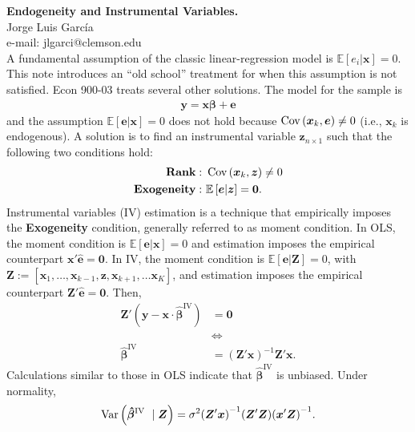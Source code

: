 
\let\counterwithout\relax
\let\counterwithin\relax
{}




\noindent \textbf{Endogeneity and Instrumental Variables.}\\
\noindent Jorge Luis García \\
\noindent e-mail: jlgarci@clemson.edu\\

\noindent A fundamental assumption of the classic linear-regression model is $\mathbb{E} \left[ e_i | \bm{x} \right] = 0$. This note introduces an ``old school'' treatment for when this assumption is not satisfied. Econ 900-03 treats several other solutions. The model for the sample is 
\begin{align}
	\bm{y} = \bm{x} \bm{\beta} + \bm{e} 
\end{align}
\noindent and the assumption $\mathbb{E} \left[ \bm{e} | \bm{x} \right] = 0$ does not hold because $ \operatorname{Cov} \left( \bm{x}_k, \bm{e}  \right) \neq 0$ (i.e., $\bm{x}_k$ is endogenous). A solution is to find an instrumental variable $\bm{z}_{n \times 1}$ such that the following two conditions hold:
\begin{align}
	\textbf{Rank}: \ & \operatorname{Cov} \left( \bm{x}_k, \bm{z} \right) \neq 0 \nonumber \\ 
	\textbf{Exogeneity}: \ & \mathbb{E} \left[ \bm{e} | \bm{z} \right]= \bm{0}.
	\nonumber \\
\end{align}
\noindent Instrumental variables (IV) estimation is a technique that empirically imposes the \textbf{Exogeneity} condition, generally referred to as moment condition. In OLS, the moment condition is $\mathbb{E} \left[ \bm{e} | \bm{x} \right] = 0$ and estimation imposes the empirical counterpart $\bm{x}' \bm{\hat{e}} = \bm{0}$. In IV, the moment condition is $\mathbb{E} \left[ \bm{e} | \bm{Z} \right] = 0$, with $\bm{Z} := \left[ \bm{x}_1, \ldots, \bm{x}_{k-1}, \bm{z}, \bm{x}_{k+1}, \ldots \bm{x}_K \right]$, and estimation imposes the empirical counterpart $\bm{Z}' \bm{\hat{e}} = \bm{0}$. Then,
\begin{align}
	\bm{Z}' \left( \bm{y} - \bm{x} \cdot \bm{\hat{\beta}}^{\text{IV}} \right) &= \bm{0} \nonumber \\
	& \Leftrightarrow \nonumber \\ 
	\bm{\hat{\beta}}^{\text{IV}} & = {\left( \bm{Z}' \bm{x} \right)}^{-1} \bm{Z}' \bm{x}. 
\end{align}
\noindent Calculations similar to those in OLS indicate that $\bm{\hat{\beta}}^{\text{IV}}$ is unbiased. Under normality,  
\begin{align}
	\operatorname{Var} \left( \bm{\hat{\beta}}^{\text{IV}} \ \mid \bm{Z} \right) = \sigma^2 {\left( \bm{Z}' \bm{x} \right)}^{-1} { \left( \bm{Z}' \bm{Z}  \right) } {\left( \bm{x}' \bm{Z} \right)}^{-1}. 
\end{align}

